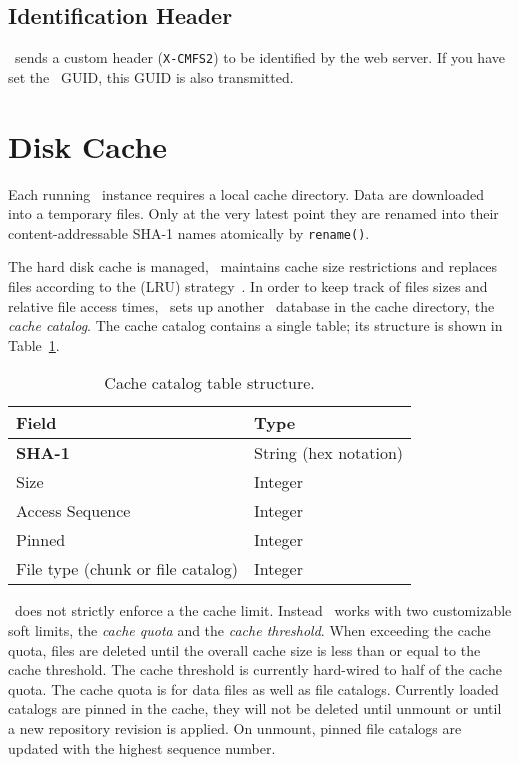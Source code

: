 \subsection{Identification Header}
\cvmfs\ sends a custom header (\lstinline{X-CMFS2}) to be identified by the web server.
If you have set the \cernvm\ GUID, this GUID is also transmitted.

\section{Disk Cache}
\label{sct:mamangedcache}
Each running \cvmfs\ instance requires a local cache directory.
Data are downloaded into a temporary files.
Only at the very latest point they are renamed into their content-addressable SHA-1 names atomically by \texttt{rename()}.

The hard disk cache is managed, \ie \cvmfs\ maintains cache size restrictions and replaces files according to the  (LRU) strategy~\cite{lru06}.
In order to keep track of files sizes and relative file access times, \cvmfs\ sets up another \sqlite\ database in the cache directory, the \emph{cache catalog}.
The cache catalog contains a single table; its structure is shown in Table~\ref{tab:cachecatalog}.
\begin{table}
	\begin{center}
		\begin{tabular}{ll}
			\toprule
			\bf Field 							& \bf Type \\
			\midrule
			\bf SHA-1 							& String (hex notation) \\
			Size 								& Integer \\
			Access Sequence						& Integer \\
			Pinned								& Integer \\
			File type (chunk or file catalog)	& Integer\\
			\bottomrule
		\end{tabular}
	\end{center}
	\caption{Cache catalog table structure.}
	\label{tab:cachecatalog}
\end{table}

\cvmfs\ does not strictly enforce a the cache limit.
Instead \cvmfs\ works with two customizable soft limits, the \emph{cache quota} and the \emph{cache threshold}.
When exceeding the cache quota, files are deleted until the overall cache size is less than or equal to the cache threshold.
The cache threshold is currently hard-wired to half of the cache quota.
The cache quota is for data files as well as file catalogs.
Currently loaded catalogs are pinned in the cache, \ie they will not be deleted until unmount or until a new repository revision is applied.
On unmount, pinned file catalogs are updated with the highest sequence number.

